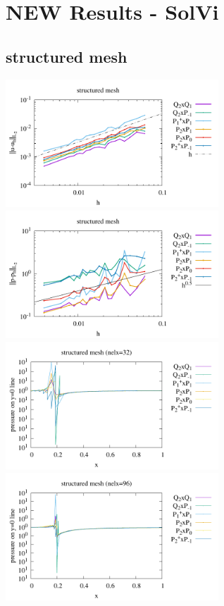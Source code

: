 \newpage
\section*{NEW Results - SolVi}

\subsection*{structured mesh}

\begin{center}
\includegraphics[width=8cm]{python_codes/fieldstone_120/paperresults/solvi_structured_errorsV.pdf}
\includegraphics[width=8cm]{python_codes/fieldstone_120/paperresults/solvi_structured_errorsP.pdf}\\
\includegraphics[width=8cm]{python_codes/fieldstone_120/paperresults/solvi_p_profile_structured_32.pdf}
\includegraphics[width=8cm]{python_codes/fieldstone_120/paperresults/solvi_p_profile_structured_96.pdf}
\end{center}


